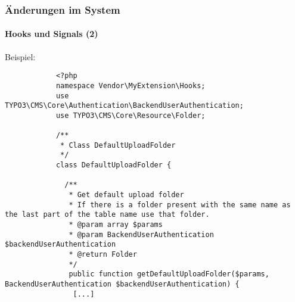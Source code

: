 \begin{frame}[fragile]
	\frametitle{Änderungen im System}
	\framesubtitle{Hooks und Signals (2)}

	\lstset{basicstyle=\tiny\ttfamily}

	\small Beispiel:\normalsize

		\begin{lstlisting}
			<?php
			namespace Vendor\MyExtension\Hooks;
			use TYPO3\CMS\Core\Authentication\BackendUserAuthentication;
			use TYPO3\CMS\Core\Resource\Folder;

			/**
			 * Class DefaultUploadFolder
			 */
			class DefaultUploadFolder {

			  /**
			   * Get default upload folder
			   * If there is a folder present with the same name as the last part of the table name use that folder.
			   * @param array $params
			   * @param BackendUserAuthentication $backendUserAuthentication
			   * @return Folder
			   */
			   public function getDefaultUploadFolder($params, BackendUserAuthentication $backendUserAuthentication) {
			    [...]
		\end{lstlisting}

\end{frame}

